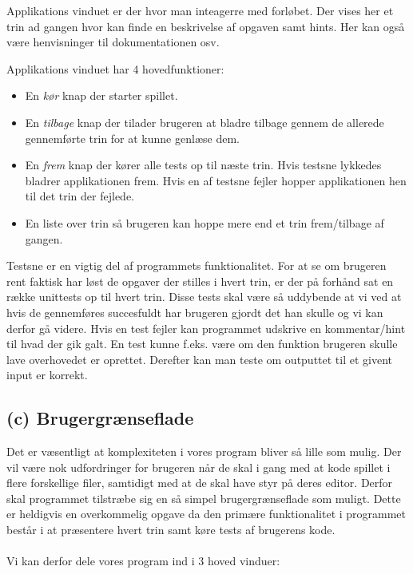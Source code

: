 \documentclass[10pt,a4paper,danish]{article}
\begin{document}
Applikations vinduet er der hvor man inteagerre med forløbet.
Der vises her et trin ad gangen hvor kan finde en beskrivelse af opgaven samt hints. Her kan også være henvisninger til dokumentationen osv.

Applikations vinduet har 4 hovedfunktioner:
\begin{itemize}
  \item En \textit{kør} knap der starter spillet.
  \item En \textit{tilbage} knap der tilader brugeren at bladre tilbage gennem de allerede gennemførte trin for at kunne genlæse dem. 
  \item En \textit{frem} knap der kører alle tests op til næste trin. Hvis testsne lykkedes bladrer applikationen frem. Hvis en af testsne fejler hopper applikationen hen til det trin der fejlede.
  \item En liste over trin så brugeren kan hoppe mere end et trin frem/tilbage af gangen.
\end{itemize}
 
Testsne er en vigtig del af programmets funktionalitet.
For at se om brugeren rent faktisk har løst de opgaver der stilles i hvert trin, er der på forhånd sat en række unittests op til hvert trin. Disse tests skal være så uddybende at vi ved at hvis de gennemføres succesfuldt har brugeren gjordt det han skulle og vi kan derfor gå videre. Hvis en test fejler kan programmet udskrive en kommentar/hint til hvad der gik galt. En test kunne f.eks. være om den funktion brugeren skulle lave overhovedet er oprettet. Derefter kan man teste om outputtet til et givent input er korrekt. 
\subsection{(c) Brugergrænseflade}
Det er væsentligt at komplexiteten i vores program bliver så lille som mulig.
Der vil være nok udfordringer for brugeren når de skal i gang med at kode spillet i flere forskellige filer, samtidigt med at de skal have styr på deres editor.
Derfor skal programmet tilstræbe sig en så simpel brugergrænseflade som muligt.
Dette er heldigvis en overkommelig opgave da den primære funktionalitet i programmet består i at præsentere hvert trin samt køre tests af brugerens kode.

\paragraph{}
Vi kan derfor dele vores program ind i 3 hoved vinduer:
\end{document}
